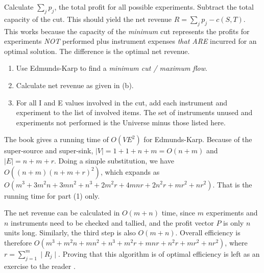 \documentclass[10pt,fullpage]{article}
\begin{document}
Calculate $\sum_jp_j$, the total profit for all possible
experiments. Subtract the total capacity of the cut. This should
yield the net revenue $R = \sum_jp_j - c(S,T)$. This works because
the capacity of the {\em minimum} cut represents the profits for
experiments {\em NOT} performed plus instrument expenses {\em that
ARE} incurred for an optimal solution. The difference is the optimal
net revenue.


\begin{enumerate}
  \item Use Edmunds-Karp to find a {\em minimum cut / maximum flow}.
  \item Calculate net revenue as given in (b).
  \item For all I and E values involved in the cut, add each instrument
and experiment to the list of involved items. The set of instruments
unused and experiments not performed is the Universe minus those
listed here.
\end{enumerate}

The book gives a running time of $O(V E^2)$ for Edmunds-Karp.
Because of the super-source and super-sink, $|V| = 1 + 1 + n + m =
O(n+m)$ and $|E| = n + m + r$. Doing a simple substitution, we have
$O((n+m)(n + m + r)^2)$, which expands as $O({m^3}+3 {m^2} n+3 m
{n^2}+{n^3}+2 {m^2} r+4 m n r+2 {n^2} r+m {r^2}+n {r^2})$. That is
the running time for part (1) only.

The net revenue can be calculated in $O(m + n)$ time, since $m$
experiments and $n$ instruments need to be checked and tallied, and
the profit vector $P$ is only $n$ units long. Similarly, the third
step is also $O(m + n)$. Overall efficiency is therefore $O({m^3}+
{m^2}n + m{n^2}+ {n^3} + {m^2}r + mnr + {n^2}r + m{r^2} + n{r^2})$,
where $r = \sum_{j=1}^m\mid R_j \mid$. Proving that this algorithm
is of optimal efficiency is left as an exercise to the reader
\smiley.

\newpage
\vspace*{4.5 in} 
\end{document}
